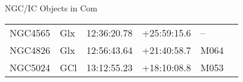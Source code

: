 \begin{block}{NGC/IC Objects in Com}
  \centering
  \begin{tabularx}{\textwidth}{llrrll} \toprule 
    NGC4565 & Glx & 12:36:20.78 & +25:59:15.6  & -- \\ 
    NGC4826 & Glx & 12:56:43.64 & +21:40:58.7  & M064 \\ 
    NGC5024 & GCl & 13:12:55.23 & +18:10:08.8  & M053 \\ 
  \end{tabularx}
\end{block}